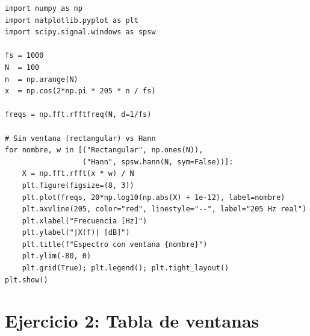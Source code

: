 \documentclass[11pt, a4paper]{article}
\begin{document}
\begin{lstlisting}[style=pystyle, caption={Visualizaci\'on r\'apida del desparramo}]
import numpy as np
import matplotlib.pyplot as plt
import scipy.signal.windows as spsw

fs = 1000
N  = 100
n  = np.arange(N)
x  = np.cos(2*np.pi * 205 * n / fs)

freqs = np.fft.rfftfreq(N, d=1/fs)

# Sin ventana (rectangular) vs Hann
for nombre, w in [("Rectangular", np.ones(N)),
                  ("Hann", spsw.hann(N, sym=False))]:
    X = np.fft.rfft(x * w) / N
    plt.figure(figsize=(8, 3))
    plt.plot(freqs, 20*np.log10(np.abs(X) + 1e-12), label=nombre)
    plt.axvline(205, color="red", linestyle="--", label="205 Hz real")
    plt.xlabel("Frecuencia [Hz]")
    plt.ylabel("|X(f)| [dB]")
    plt.title(f"Espectro con ventana {nombre}")
    plt.ylim(-80, 0)
    plt.grid(True); plt.legend(); plt.tight_layout()
plt.show()
\end{lstlisting}

\section*{Ejercicio 2: Tabla de ventanas}
\end{document}
